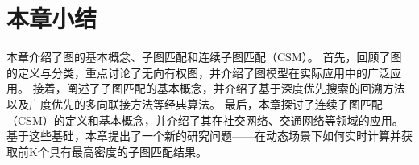 \section{本章小结}
本章介绍了图的基本概念、子图匹配和连续子图匹配（CSM）。
首先，回顾了图的定义与分类，重点讨论了无向有权图，并介绍了图模型在实际应用中的广泛应用。
接着，阐述了子图匹配的基本概念，并介绍了基于深度优先搜索的回溯方法以及广度优先的多向联接方法等经典算法。
最后，本章探讨了连续子图匹配（CSM）的定义和基本概念，并介绍了其在社交网络、交通网络等领域的应用。
基于这些基础，本章提出了一个新的研究问题——在动态场景下如何实时计算并获取前K个具有最高密度的子图匹配结果。